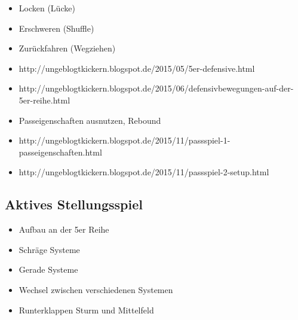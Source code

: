 \begin{itemize}
\item Locken (Lücke)
\item Erschweren (Shuffle)
\item Zurückfahren (Wegziehen)
\item http://ungeblogtkickern.blogspot.de/2015/05/5er-defensive.html
\item http://ungeblogtkickern.blogspot.de/2015/06/defensivbewegungen-auf-der-5er-reihe.html
\item Passeigenschaften ausnutzen, Rebound
\item http://ungeblogtkickern.blogspot.de/2015/11/passspiel-1-passeigenschaften.html
\item http://ungeblogtkickern.blogspot.de/2015/11/passspiel-2-setup.html
\end{itemize}  



\subsection{Aktives Stellungsspiel}
\label{taktik:defensive:aktivesstellungsspiel}

\begin{itemize}
\item Aufbau an der 5er Reihe
\item Schräge Systeme
\item Gerade Systeme
\item Wechsel zwischen verschiedenen Systemen
\item Runterklappen Sturm und Mittelfeld
\end{itemize}
